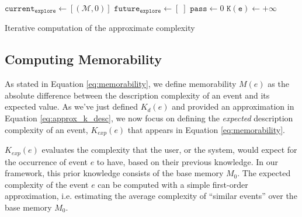 \documentclass[entropy,article,submit,moreauthors,pdftex]{Definitions/mdpi}
\begin{document}
\begin{algorithm}
    $\mathtt{current_{explore}} \leftarrow [(\mathcal{M}, 0)]$ \;
    $\mathtt{future_{explore} \leftarrow} [\;]$ \;
    $\mathtt{pass} \leftarrow 0$ \;
    $\mathtt{K(e)} \leftarrow +\infty$ \;
    \caption{Iterative computation of the approximate complexity}
    \label{alg:complex_iter}
\end{algorithm}

\subsection{Computing Memorability}
As stated in Equation \ref{eq:memorability}, we define memorability $M(e)$ as the absolute difference between the description complexity of an event and its expected value. As we've just defined $K_d(e)$ and provided an approximation in Equation \ref{eq:approx_k_desc}, we now focus on defining the \emph{expected} description complexity of an event, $K_{exp}(e)$ that appears in Equation \ref{eq:memorability}.

$K_{exp}(e)$ evaluates the complexity that the user, or the system, would expect for the occurrence of event $e$ to have, based on their previous knowledge. In our framework, this prior knowledge consists of the base memory $M_0$. The expected complexity of the event $e$ can be computed with a simple first-order approximation, i.e. estimating the average complexity of ``similar events'' over the base memory $M_0$.
\end{document}
